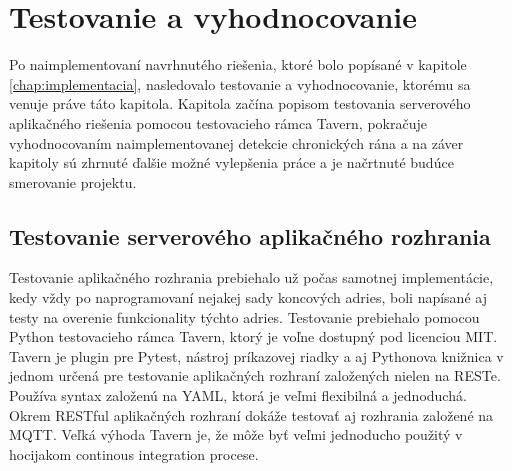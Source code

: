 \chapter{Testovanie a vyhodnocovanie}
\label{chap:testovanie-vyhodnocovanie}
Po naimplementovaní navrhnutého riešenia, ktoré bolo popísané v kapitole \ref{chap:implementacia}, nasledovalo testovanie a vyhodnocovanie, ktorému sa venuje práve táto kapitola.  Kapitola začína popisom testovania serverového aplikačného riešenia pomocou testovacieho rámca Tavern, pokračuje vyhodnocovaním naimplementovanej detekcie chronických rána a na záver kapitoly sú zhrnuté ďalšie možné vylepšenia práce a je načrtnuté budúce smerovanie projektu. 

\section{Testovanie serverového aplikačného rozhrania}
Testovanie aplikačného rozhrania prebiehalo už počas samotnej implementácie, kedy vždy po naprogramovaní nejakej sady koncových adries, boli napísané aj testy na overenie funkcionality týchto adries. Testovanie prebiehalo pomocou Python testovacieho rámca Tavern, ktorý je voľne dostupný pod licenciou MIT. Tavern je plugin pre Pytest, nástroj príkazovej riadky a aj Pythonova knižnica v jednom určená pre testovanie aplikačných rozhraní založených nielen na RESTe. Používa syntax založenú na YAML, ktorá je veľmi flexibilná a jednoduchá. Okrem RESTful aplikačných rozhraní dokáže testovať aj rozhrania založené na MQTT. Veľká výhoda Tavern je, že môže byť veľmi jednoducho použitý v hocijakom continous integration procese. \cite{AXUaooptJGOSpUrX} 

